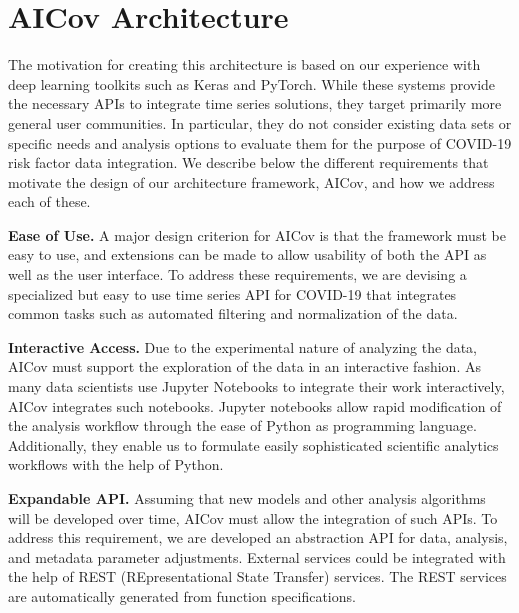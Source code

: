 \documentclass[letterpaper, inpress]{jds} %
\renewcommand{\_}{%
    \textunderscore\hspace{0pt}%
}
\begin{document}
\section{AICov Architecture}
\label{sec:arch}

The motivation for creating this architecture is based on our
experience with deep learning toolkits such as Keras and
PyTorch. While these systems provide the necessary APIs to integrate
time series solutions, they target primarily more general user
communities. In particular, they do not consider existing data sets or
specific needs and analysis options to evaluate them for the purpose
of COVID-19 risk factor data integration. We describe below the
different requirements that motivate the design of our architecture
framework, AICov, and how we address each of these.

\newcommand{\Solution}{}

\begin{requirement}{\bf Ease of Use.}
  A major design criterion for AICov is that the framework must be
  easy to use, and extensions can be made to allow usability of both
  the API as well as the user interface. \Solution To address these
  requirements, we are devising a specialized but easy to use time
  series API for COVID-19 that integrates common tasks such as
  automated filtering and normalization of the data.
\end{requirement}


\begin{requirement}{\bf Interactive Access.}
  Due to the experimental nature of analyzing the data, AICov must
  support the exploration of the data in an interactive
  fashion. \Solution As many data scientists use Jupyter Notebooks to
  integrate their work interactively, AICov integrates such
  notebooks. Jupyter notebooks allow rapid modification of the
  analysis workflow through the ease of Python as programming
  language. Additionally, they enable us to formulate easily
  sophisticated scientific analytics workflows with the help of
  Python.
\end{requirement}


\begin{requirement}{\bf Expandable API.}
  Assuming that new models and other analysis algorithms will be
  developed over time, AICov must allow the integration of such
  APIs. \Solution To address this requirement, we are developed an
  abstraction API for data, analysis, and metadata parameter
  adjustments. External services could be integrated with the help of
  REST (REpresentational State Transfer) services. The REST services
  are automatically generated from function specifications.
\end{requirement}
\end{document}
